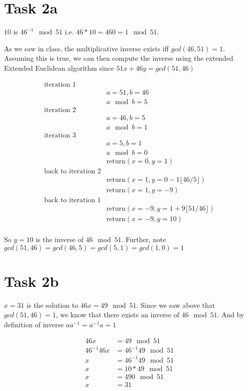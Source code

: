 \documentclass{article}
\begin{document}
    \section*{Task 2a}
    $10$ is $46^{-1} \mod 51$ i.e. $46 * 10 = 460 = 1 \mod 51$.

    As we saw in class, the multiplicative inverse exists iff $gcd(46, 51) = 1$. Assuming this is true, we can then compute the inverse using the extended Extended Euclidean algorithm since $51x + 46y = gcd(51, 46)$

    \begin{align*}
        \text{iteration 1} \\
            & a = 51, b = 46 \\
            & a \mod b = 5 \\
        \text{iteration 2} \\
            & a = 46, b = 5 \\
            & a \mod b = 1 \\
        \text{iteration 3} \\
            & a = 5, b = 1 \\
            & a \mod b = 0 \\
            & \text{return} (x = 0, y = 1) \\
        \text{back to iteration 2} \\
            & \text{return} (x = 1, y = 0 - 1 \lfloor 46/5 \rfloor) \\
            & \text{return} (x = 1, y = -9) \\
        \text{back to iteration 1} \\
            & \text{return} (x = -9, y = 1 + 9 \lfloor 51/46 \rfloor) \\
            & \text{return} (x = -9, y = 10) \\
    \end{align*}

    So $y = 10$ is the inverse of $46 \mod 51$. Further, note $gcd(51, 46) = gcd(46, 5) = gcd(5, 1) = gcd(1, 0) = 1$

    \section*{Task 2b}
    $x = 31$ is the solution to $46x = 49 \mod 51$. Since we saw above that $gcd(51, 46) = 1$, we know that there exists an inverse of $46 \mod 51$. And by definition of inverse $aa^{-1} = a^{-1}a = 1$

    \begin{align*}
        46x             & = 49 \mod 51 \\
        46^{-1} 46x   & = 46^{-1} 49 \mod 51 \\
        x               & = 46^{-1} 49 \mod 51 \\
        x               & = 10 * 49 \mod 51 \\
        x               & = 490 \mod 51 \\
        x               & = 31
    \end{align*}
\end{document}

